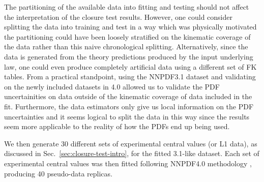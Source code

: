 The partitioning of the available data into fitting and testing should not
affect the interpretation of the closure test results. However, one
could consider splitting the data into training and test in a way which was
physically motivated \eg the partitioning could have been loosely
stratified on the kinematic coverage of the data rather than this naive
chronological splitting.
Alternatively, since the data is generated from the theory predictions produced
by the input underlying law, one could even produce completely artificial data
using a different set of FK tables. From a practical standpoint, using the
NNPDF3.1 dataset and validating on the newly included datasets in 4.0 allowed us
to validate the PDF uncertainities on data outside of the kinematic coverage of
data included in the fit. Furthermore, the data estimators only give us local
information on the PDF uncertainties and it seems logical to split the data in
this way since the results seem more applicable to the reality of how the PDFs
end up being used.

We then generate 30 different sets of experimental central values (or L1 data),
as discussed in Sec.~\ref{sec:closure-test-intro}, for the fitted 3.1-like
dataset. Each set of experimental central values was then fitted following
NNPDF4.0 methodology \cite{NNPDF40}, producing 40 pseudo-data replicas.